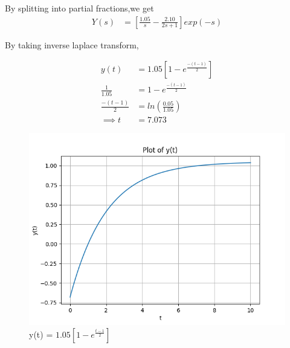 \documentclass[journal,12pt,twocolumn]{IEEEtran}
\theoremstyle{remark}
\begin{document}
By splitting into partial fractions,we get
\begin{align}
    Y(s) &= [\frac{1.05}{s} - \frac{2.10}{2s+1}]exp(-s)
\end{align}

By taking inverse laplace transform,

\begin{align}
    y(t) &= 1.05[1-e^{\frac{-(t-1)}{2}}] \\
    \frac{1}{1.05} &= 1-e^{\frac{-(t-1)}{2}} \\
    \frac{-(t-1)}{2} &= ln(\frac{0.05}{1.05}) \\
    \implies t &= 7.073 
\end{align}

\begin{figure}[h]
    \centering
    \includegraphics[width=\columnwidth]{figs/fig1.png}
    \caption{y(t) = $1.05[1-e^{\frac{t-1}{2}}]$}
    \label{fig:gate23ch62}
\end{figure}
\end{document}
